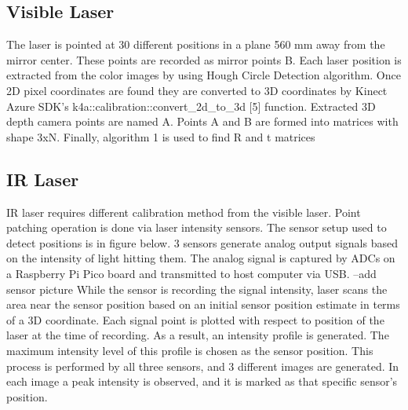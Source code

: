 \subsection{Visible Laser}
\label{sec:Visible Laser}

The laser is pointed at 30 different positions in a plane
560 mm away from the mirror center. These points are recorded
as mirror points B. Each laser position is extracted from the
color images by using Hough Circle Detection algorithm. Once
2D pixel coordinates are found they are converted to 3D
coordinates by Kinect Azure SDK's k4a::calibration::convert\_2d\_to\_3d [5]
function. Extracted 3D depth camera points are named A.
Points A and B are formed into matrices with shape 3xN.
Finally, algorithm 1 is used to find R and t matrices


\subsection{IR Laser}
\label{sec:IR Laser}

IR laser requires different calibration method from the
visible laser. Point patching operation is done via
laser intensity sensors. The sensor setup used to detect
positions is in figure below. 3 sensors generate analog
output signals based on the intensity of light hitting
them. The analog signal is captured by ADCs on a Raspberry
Pi Pico board and transmitted to host computer via USB.
--add sensor picture
While the sensor is recording the signal intensity,
laser scans the area near the sensor position based on an
initial sensor position estimate in terms of a 3D coordinate.
Each signal point is plotted with respect to position of the
laser at the time of recording. As a result, an intensity
profile is generated. The maximum intensity level of this
profile is chosen as the sensor position. This process is
performed by all three sensors, and 3 different images
are generated. In each image a peak intensity is observed,
and it is marked as that specific sensor's position.



